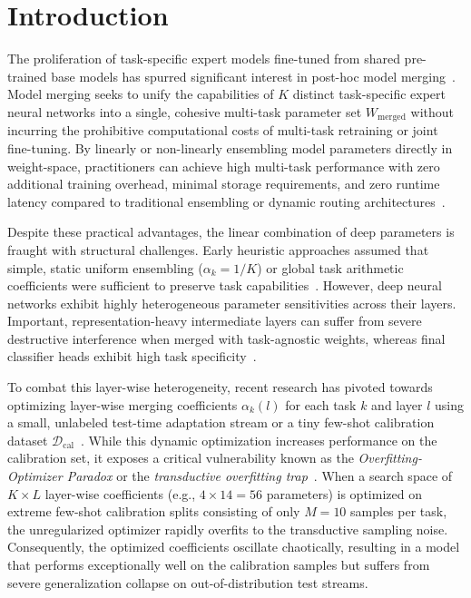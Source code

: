 \section{Introduction}
\label{sec:intro}

The proliferation of task-specific expert models fine-tuned from shared pre-trained base models has spurred significant interest in post-hoc model merging~\cite{wortsman2022model, ilharco2022editing}. Model merging seeks to unify the capabilities of $K$ distinct task-specific expert neural networks into a single, cohesive multi-task parameter set $W_{\text{merged}}$ without incurring the prohibitive computational costs of multi-task retraining or joint fine-tuning. By linearly or non-linearly ensembling model parameters directly in weight-space, practitioners can achieve high multi-task performance with zero additional training overhead, minimal storage requirements, and zero runtime latency compared to traditional ensembling or dynamic routing architectures~\cite{shazeer2017outrageously, fedus2022switch}.

Despite these practical advantages, the linear combination of deep parameters is fraught with structural challenges. Early heuristic approaches assumed that simple, static uniform ensembling ($\alpha_k = 1/K$) or global task arithmetic coefficients were sufficient to preserve task capabilities~\cite{wortsman2022model, ilharco2022editing}. However, deep neural networks exhibit highly heterogeneous parameter sensitivities across their layers. Important, representation-heavy intermediate layers can suffer from severe destructive interference when merged with task-agnostic weights, whereas final classifier heads exhibit high task specificity~\cite{yadav2023ties, ortiz2023task}. 

To combat this layer-wise heterogeneity, recent research has pivoted towards optimizing layer-wise merging coefficients $\alpha_k(l)$ for each task $k$ and layer $l$ using a small, unlabeled test-time adaptation stream or a tiny few-shot calibration dataset $\mathcal{D}_{\text{cal}}$~\cite{trial2_submission1, trial3_submission2}. While this dynamic optimization increases performance on the calibration set, it exposes a critical vulnerability known as the \emph{Overfitting-Optimizer Paradox} or the \emph{transductive overfitting trap}~\cite{trial2_submission3}. When a search space of $K \times L$ layer-wise coefficients (e.g., $4 \times 14 = 56$ parameters) is optimized on extreme few-shot calibration splits consisting of only $M = 10$ samples per task, the unregularized optimizer rapidly overfits to the transductive sampling noise. Consequently, the optimized coefficients oscillate chaotically, resulting in a model that performs exceptionally well on the calibration samples but suffers from severe generalization collapse on out-of-distribution test streams.

